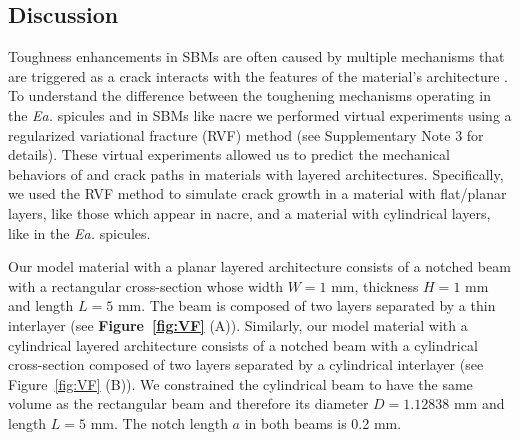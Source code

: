 \documentclass[12pt,onecolumn]{article}
\makeatletter
\DeclareRobustCommand*{\nameref}[1]{%
      \emph{\myorg@nameref{#1}}%
    }%
\newcommand{\EA}{\textit{Ea.\@}\xspace}
\makeatother
\begin{document}
\begin{bibunit}
\section*{Discussion}
\label{sec:discussion}
Toughness enhancements in SBMs are often caused by multiple mechanisms that are triggered as a crack interacts with the features of the material's architecture \cite{barthelat2007experimental,currey1977,launey2009fracture}. 
%
%
To understand the difference between the toughening mechanisms operating in the \EA spicules and in SBMs like nacre we performed virtual experiments using a regularized variational fracture (RVF) method (see Supplementary Note 3 for details). These virtual experiments allowed us to predict the  mechanical behaviors of and crack paths in materials with layered architectures. Specifically, we used the RVF method to simulate crack growth in a material with flat/planar layers, like those which appear in nacre, and a material with cylindrical layers, like in the \EA spicules.

Our model material with a planar layered architecture consists of a notched beam with a rectangular cross-section whose width $W=1$ mm, thickness $H=1$ mm and length $L=5$ mm. The beam is composed of two layers separated by a thin interlayer (see {\bf Figure~\ref{fig:VF}} (A)). Similarly, our model material with a cylindrical layered architecture consists of a notched beam with a cylindrical cross-section composed of two layers separated by a cylindrical interlayer (see Figure~\ref{fig:VF} (B)). We constrained the cylindrical beam to have the same volume as the rectangular beam and therefore its diameter $D=1.12838$ mm and length $L=5$ mm. The notch length $a$ in both beams is 0.2 mm.


\end{bibunit}
\end{document}
